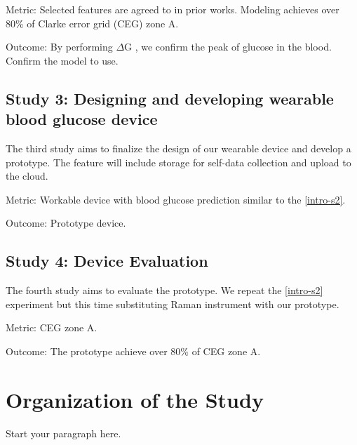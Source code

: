 Metric: Selected features are agreed to in prior works. Modeling achieves over 80\% of Clarke error grid (CEG) zone A.

Outcome: By performing $\Delta$G \citep{directGlucose}, we confirm the peak of glucose in the blood. Confirm the model to use.

\subsection{Study 3: Designing and developing wearable blood glucose device}

The third study aims to finalize the design of our wearable device and develop a prototype.
The feature will include storage for self-data collection and upload to the cloud.

Metric: Workable device with blood glucose prediction similar to the \ref{intro-s2}.

Outcome: Prototype device.

\subsection{Study 4: Device Evaluation}

The fourth study aims to evaluate the prototype.
We repeat the \ref{intro-s2} experiment but this time substituting Raman instrument with our prototype.

Metric: CEG zone A.

Outcome: The prototype achieve over 80\% of CEG zone A.

\section{Organization of the Study}
Start your paragraph here.